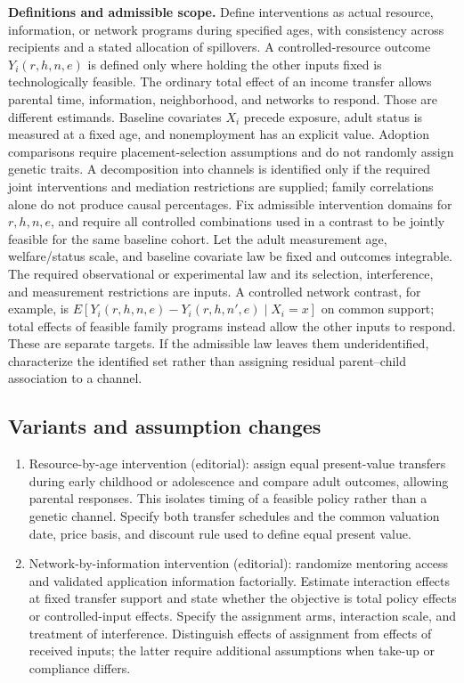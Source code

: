 \documentclass[11pt,a4paper]{article}
\begin{document}
\textbf{Definitions and admissible scope.} Define interventions as actual resource, information, or network programs during specified ages, with consistency across recipients and a stated allocation of spillovers. A controlled-resource outcome \(Y_i(r,h,n,e)\) is defined only where holding the other inputs fixed is technologically feasible. The ordinary total effect of an income transfer allows parental time, information, neighborhood, and networks to respond. Those are different estimands. Baseline covariates \(X_i\) precede exposure, adult status is measured at a fixed age, and nonemployment has an explicit value. Adoption comparisons require placement-selection assumptions and do not randomly assign genetic traits. A decomposition into channels is identified only if the required joint interventions and mediation restrictions are supplied; family correlations alone do not produce causal percentages. Fix admissible intervention domains for \(r,h,n,e\), and require all controlled combinations used in a contrast to be jointly feasible for the same baseline cohort. Let the adult measurement age, welfare/status scale, and baseline covariate law be fixed and outcomes integrable. The required observational or experimental law and its selection, interference, and measurement restrictions are inputs. A controlled network contrast, for example, is \(E[Y_i(r,h,n,e)-Y_i(r,h,n',e)\mid X_i=x]\) on common support; total effects of feasible family programs instead allow the other inputs to respond. These are separate targets. If the admissible law leaves them underidentified, characterize the identified set rather than assigning residual parent--child association to a channel.
\subsection*{Variants and assumption changes}
\begin{enumerate}
\item Resource-by-age intervention (editorial): assign equal present-value transfers during early childhood or adolescence and compare adult outcomes, allowing parental responses. This isolates timing of a feasible policy rather than a genetic channel. Specify both transfer schedules and the common valuation date, price basis, and discount rule used to define equal present value.
\item Network-by-information intervention (editorial): randomize mentoring access and validated application information factorially. Estimate interaction effects at fixed transfer support and state whether the objective is total policy effects or controlled-input effects. Specify the assignment arms, interaction scale, and treatment of interference. Distinguish effects of assignment from effects of received inputs; the latter require additional assumptions when take-up or compliance differs.
\end{enumerate}
\end{document}
